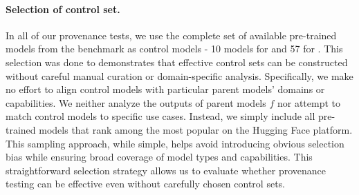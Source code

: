 \paragraph{Selection of control set.}
%
In all of our provenance tests, we use the complete set of available pre-trained models from the benchmark as control models - 10 models for \bencho and 57 for \bencht. This selection was done to demonstrates that effective control sets can be constructed without careful manual curation or domain-specific analysis.
%
Specifically, we make no effort to align control models with particular parent models' domains or capabilities. We neither analyze the outputs of parent models $f$ nor attempt to match control models to specific use cases. Instead, we simply include all pre-trained models that rank among the most popular on the Hugging Face platform. This sampling approach, while simple, helps avoid introducing obvious selection bias while ensuring broad coverage of model types and capabilities.
%
This straightforward selection strategy allows us to evaluate whether provenance testing can be effective even without carefully chosen control sets. 
%








%

